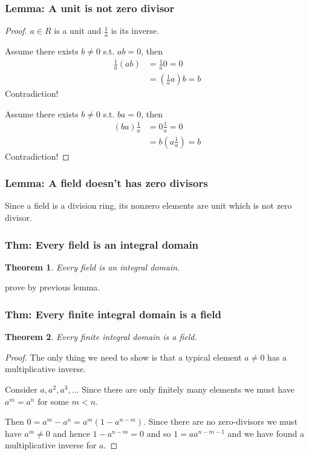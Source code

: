 \documentclass[11pt,a4paper]{article}
\newtheorem{theorem}{Theorem}
\begin{document}
\subsubsection{Lemma: A unit is not zero divisor}
\begin{proof}
    $a\in R$ is a unit and $\frac{1}{a}$ is its inverse.

    Assume there exists $b\neq 0$ s.t. $ab=0$, then
    \begin{equation}
        \begin{aligned}
            \frac{1}{a}(ab)&=\frac{1}{a}0=0\\
            &=(\frac{1}{a}a)b=b
        \end{aligned}
        \nonumber
    \end{equation}
    Contradiction!

    Assume there exists $b\neq 0$ s.t. $ba=0$, then
    \begin{equation}
        \begin{aligned}
            (ba)\frac{1}{a}&=0\frac{1}{a}=0\\
            &=b(a\frac{1}{a})=b
        \end{aligned}
        \nonumber
    \end{equation}
    Contradiction!
\end{proof}
\subsubsection{Lemma: A field doesn't has zero divisors}
Since a field is a division ring, its nonzero elements are unit which is not zero divisor.

\subsubsection{Thm: Every field is an integral domain}
\begin{theorem}
    Every field is an integral domain.
\end{theorem}
prove by previous lemma.

\subsubsection{Thm: Every finite integral domain is a field}
\begin{theorem}
    Every finite integral domain is a field.
\end{theorem}
\begin{proof}
The only thing we need to show is that a typical element $a \neq 0$ has a multiplicative inverse.

Consider $a, a^2, a^3, ...$ Since there are only finitely many elements we must have $a^m = a^n$ for some $m < n$.

Then $0 = a^m - a^n = a^m(1 - a^{n-m})$. Since there are no zero-divisors we must have $a^m \neq 0$ and hence $1 - a^{n-m} = 0$ and so $1 = a a^{n-m-1}$ and we have found a multiplicative inverse for $a$.
\end{proof}
\end{document}
